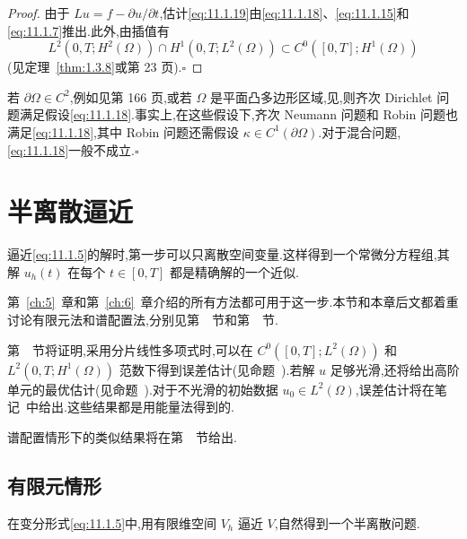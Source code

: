 \begin{proof}
由于 \(Lu=f-\partial u/\partial t\),估计\eqref{eq:11.1.19}由\eqref{eq:11.1.18}、\eqref{eq:11.1.15}和\eqref{eq:11.1.7}推出.此外,由插值有
\[
  L^2(0,T;H^2(\Omega))\cap H^1(0,T;L^2(\Omega))
    \subset C^0([0,T];H^1(\Omega))
\]
(见定理~\ref{thm:1.3.8}或第 23 页).\hfill\(\square\)
\end{proof}

\begin{note}
若 \(\partial\Omega\in C^2\),例如见第 166 页,或若 \(\Omega\) 是平面凸多边形区域,见,则齐次 Dirichlet 问题满足假设\eqref{eq:11.1.18}.事实上,在这些假设下,齐次 Neumann 问题和 Robin 问题也满足\eqref{eq:11.1.18},其中 Robin 问题还需假设 \(\kappa\in C^1(\partial\Omega)\).对于混合问题,\eqref{eq:11.1.18}一般不成立.\hfill\(\square\)
\end{note}

\section{半离散逼近}\label{sec:11.2}

逼近\eqref{eq:11.1.5}的解时,第一步可以只离散空间变量.这样得到一个常微分方程组,其解 \(u_h(t)\) 在每个 \(t\in[0,T]\) 都是精确解的一个近似.

第~\ref{ch:5}~章和第~\ref{ch:6}~章介绍的所有方法都可用于这一步.本节和本章后文都着重讨论有限元法和谱配置法,分别见第~~节和第~~节.

第~~节将证明,采用分片线性多项式时,可以在 \(C^0([0,T];L^2(\Omega))\) 和 \(L^2(0,T;H^1(\Omega))\) 范数下得到误差估计(见命题~).若解 \(u\) 足够光滑,还将给出高阶单元的最优估计(见命题~).对于不光滑的初始数据 \(u_0\in L^2(\Omega)\),误差估计将在笔记~中给出.这些结果都是用能量法得到的.

谱配置情形下的类似结果将在第~~节给出.

\subsection{有限元情形}\label{sec:11.2.1}

在变分形式\eqref{eq:11.1.5}中,用有限维空间 \(V_h\) 逼近 \(V\),自然得到一个半离散问题.


